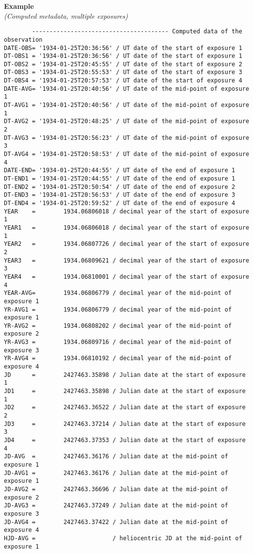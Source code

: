 \documentclass[11pt]{ivoa}
\newenvironment{fitsexample}[1]
{\bigskip\noindent\textbf{Example}\\\textit{(#1\smallskip)}}
{\medskip}
\begin{document}
\begin{fitsexample}{Computed metadata, multiple exposures}
\begin{lstlisting}
        --------------------------------------- Computed data of the observation
DATE-OBS= '1934-01-25T20:36:56' / UT date of the start of exposure 1
DT-OBS1 = '1934-01-25T20:36:56' / UT date of the start of exposure 1
DT-OBS2 = '1934-01-25T20:45:55' / UT date of the start of exposure 2
DT-OBS3 = '1934-01-25T20:55:53' / UT date of the start of exposure 3
DT-OBS4 = '1934-01-25T20:57:53' / UT date of the start of exposure 4
DATE-AVG= '1934-01-25T20:40:56' / UT date of the mid-point of exposure 1
DT-AVG1 = '1934-01-25T20:40:56' / UT date of the mid-point of exposure 1
DT-AVG2 = '1934-01-25T20:48:25' / UT date of the mid-point of exposure 2
DT-AVG3 = '1934-01-25T20:56:23' / UT date of the mid-point of exposure 3
DT-AVG4 = '1934-01-25T20:58:53' / UT date of the mid-point of exposure 4
DATE-END= '1934-01-25T20:44:55' / UT date of the end of exposure 1
DT-END1 = '1934-01-25T20:44:55' / UT date of the end of exposure 1
DT-END2 = '1934-01-25T20:50:54' / UT date of the end of exposure 2
DT-END3 = '1934-01-25T20:56:53' / UT date of the end of exposure 3
DT-END4 = '1934-01-25T20:59:52' / UT date of the end of exposure 4
YEAR    =        1934.06806018 / decimal year of the start of exposure 1
YEAR1   =        1934.06806018 / decimal year of the start of exposure 1
YEAR2   =        1934.06807726 / decimal year of the start of exposure 2
YEAR3   =        1934.06809621 / decimal year of the start of exposure 3
YEAR4   =        1934.06810001 / decimal year of the start of exposure 4
YEAR-AVG=        1934.06806779 / decimal year of the mid-point of exposure 1
YR-AVG1 =        1934.06806779 / decimal year of the mid-point of exposure 1
YR-AVG2 =        1934.06808202 / decimal year of the mid-point of exposure 2
YR-AVG3 =        1934.06809716 / decimal year of the mid-point of exposure 3
YR-AVG4 =        1934.06810192 / decimal year of the mid-point of exposure 4
JD      =        2427463.35898 / Julian date at the start of exposure 1
JD1     =        2427463.35898 / Julian date at the start of exposure 1
JD2     =        2427463.36522 / Julian date at the start of exposure 2
JD3     =        2427463.37214 / Julian date at the start of exposure 3
JD4     =        2427463.37353 / Julian date at the start of exposure 4
JD-AVG  =        2427463.36176 / Julian date at the mid-point of exposure 1
JD-AVG1 =        2427463.36176 / Julian date at the mid-point of exposure 1
JD-AVG2 =        2427463.36696 / Julian date at the mid-point of exposure 2
JD-AVG3 =        2427463.37249 / Julian date at the mid-point of exposure 3
JD-AVG4 =        2427463.37422 / Julian date at the mid-point of exposure 4
HJD-AVG =                      / heliocentric JD at the mid-point of exposure 1
\end{lstlisting}
\end{fitsexample}
\end{document}

